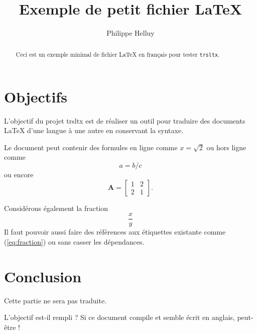 
\title{Exemple de petit fichier \LaTeX}
\author{Philippe Helluy}
\maketitle
\begin{abstract}
Ceci est un exemple minimal de fichier \LaTeX{} en français pour tester
\texttt{trsltx}.
\end{abstract}
\section{Objectifs}
L'objectif du projet trsltx est de réaliser un outil pour traduire
des documents \LaTeX{}
d'une langue à une autre en conservant {} la syntaxe.

Le document peut contenir des formules en ligne comme $x=\sqrt{2}$
ou hors ligne comme $$a=b/c$$ ou encore 
\begin{equation}
\mathbf{A}=\left[\begin{array}{cc}
1 & 2\\
2 & 1
\end{array}\right].\label{eq:matrice}
\end{equation}

Considérons également la fraction
\begin{equation}
\frac{x}{y} \label{eq:fraction}
\end{equation}
Il faut pouvoir aussi faire des références aux étiquettes existante
comme (\ref{eq:fraction}) ou  sans casser les dépendances.
\section{Conclusion}

Cette partie ne 
sera pas traduite.

L'objectif est-il rempli ? Si ce document compile et semble écrit
en anglais, peut-être !
